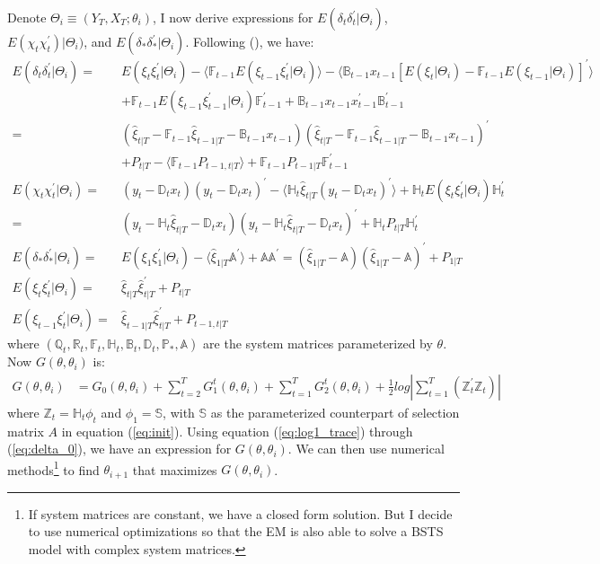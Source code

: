\documentclass[10pt, titlepage]{article}
\numberwithin{equation}{section}
\begin{document}
Denote $\Theta_i\equiv (Y_T,X_T;\theta_i)$, I now derive expressions for $E(\delta_t\delta_t^{'}|\Theta_i)$, $E(\chi_t\chi_t^{'})|\Theta_i)$, and $E(\delta_*\delta_*^{'}|\Theta_i)$. Following (\cite{koopman1992exact}), we have:
\begin{align}
    E(\delta_t\delta_t^{'}|\Theta_i) =& E(\xi_t\xi_t^{'}|\Theta_i) - \langle \mathbb{F}_{t-1}E(\xi_{t-1}\xi_t^{'}|\Theta_i)\rangle 
        - \langle \mathbb{B}_{t-1}x_{t-1}[E(\xi_t|\Theta_i) - \mathbb{F}_{t-1}E(\xi_{t-1}|\Theta_i)]^{'}\rangle \nonumber \\
        &+\mathbb{F}_{t-1}E(\xi_{t-1}\xi_{t-1}^{'}|\Theta_i)\mathbb{F}_{t-1}^{'} + \mathbb{B}_{t-1}x_{t-1}x_{t-1}^{'}\mathbb{B}_{t-1}^{'} \nonumber \\
    =& (\hat{\xi}_{t|T}-\mathbb{F}_{t-1}\hat{\xi}_{t-1|T}-\mathbb{B}_{t-1}x_{t-1})(\hat{\xi}_{t|T}-\mathbb{F}_{t-1}\hat{\xi}_{t-1|T}-\mathbb{B}_{t-1}x_{t-1})^{'} \nonumber \\
    &+ P_{t|T} - \langle \mathbb{F}_{t-1}P_{t-1,t|T} \rangle + \mathbb{F}_{t-1}P_{t-1|T}\mathbb{F}_{t-1}^{'} \label{eq:delta_t} \\
    E(\chi_t\chi_t^{'}|\Theta_i) =& (y_t-\mathbb{D}_tx_t)(y_t-\mathbb{D}_tx_t)^{'}-\langle \mathbb{H}_t\hat{\xi}_{t|T}(y_t-\mathbb{D}_tx_t)^{'}\rangle + \mathbb{H}_tE(\xi_t\xi_t^{'}|\Theta_i)\mathbb{H}_t^{'} \nonumber \\
    =& (y_t - \mathbb{H}_t\hat{\xi}_{t|T} - \mathbb{D}_tx_t)(y_t - \mathbb{H}_t\hat{\xi}_{t|T} - \mathbb{D}_tx_t)^{'} + \mathbb{H}_tP_{t|T}\mathbb{H}_t^{'} \label{eq:chi_t} \\ 
    E(\delta_*\delta_*^{'}|\Theta_i) =& E(\xi_1\xi_1^{'}|\Theta_i) - \langle\hat{\xi}_{1|T}\mathbb{A}^{'}\rangle + \mathbb{A}\mathbb{A}^{'}=(\hat{\xi}_{1|T} - \mathbb{A})(\hat{\xi}_{1|T} - \mathbb{A})^{'} + P_{1|T} \label{eq:delta_0} \\
    E(\xi_t\xi_t^{'}|\Theta_i) =& \hat{\xi}_{t|T}\hat{\xi}_{t|T}^{'} + P_{t|T} \nonumber \\
    E(\xi_{t-1}\xi_t^{'}|\Theta_i) =& \hat{\xi}_{t-1|T}\hat{\xi}_{t|T}^{'} + P_{t-1,t|T} \nonumber
\end{align}
where $(\mathbb{Q}_t, \mathbb{R}_t, \mathbb{F}_t, \mathbb{H}_t, \mathbb{B}_t, \mathbb{D}_t, \mathbb{P}_{*}, \mathbb{A})$ are the system matrices parameterized by $\theta$. Now $G(\theta,\theta_{i})$ is:
\begin{align*}
    G(\theta,\theta_{i}) &= G_0(\theta,\theta_i) + \sum_{t=2}^{T}G_1^t(\theta,\theta_{i}) + \sum_{t=1}^{T}G_2^t(\theta,\theta_{i}) + \frac{1}{2}log\left|\sum_{t=1}^{T}(\mathbb{Z}_t^{'}\mathbb{Z}_t)\right| 
\end{align*}
where $\mathbb{Z}_t=\mathbb{H}_t\phi_t$ and $\phi_1=\mathbb{S}$, with $\mathbb{S}$ as the parameterized counterpart of selection matrix $A$ in equation (\ref{eq:init}). Using equation (\ref{eq:log1_trace}) through (\ref{eq:delta_0}), we have an expression for $G(\theta,\theta_i)$. We can then use numerical methods\footnote{If system matrices are constant, we have a closed form solution. But I decide to use numerical optimizations so that the EM is also able to solve a BSTS model with complex system matrices.} to find $\theta_{i+1}$ that maximizes $G(\theta,\theta_{i})$.
\end{document}
